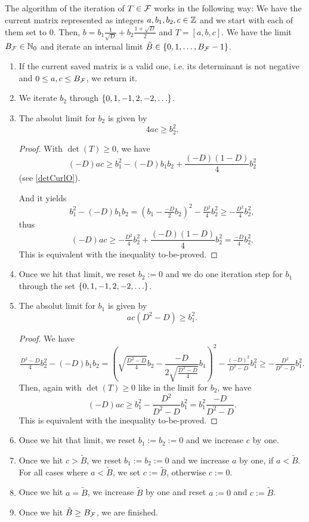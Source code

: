The algorithm of the iteration of $T \in \mathcal{F}$ works in the following way: We have the current matrix represented as integers $a,b_1,b_2,c \in \mathbb{Z}$ and we start with each of them set to $0$. Then, $b = b_1 \frac{1}{\sqrt{D}} + b_2 \frac{1 + \sqrt{D}} {2}$ and $T = [a,b,c]$. We have the limit $B_{\mathcal{F}} \in \mathbb{N}_0$ and iterate an internal limit $\tilde{B} \in \Set{0,1,\dots,B_\F-1}$.
\begin{enumerate}
\item If the current saved matrix is a valid one, i.e. its determinant is not negative and $0 \le a,c \le B_{\mathcal{F}}$, we return it.
\item We iterate $b_2$ through $\Set{0,1,-1,2,-2,\dots}$.
\item
The absolut limit for $b_2$ is given by
\[ 4 a c \ge b_2^2 . \]
\begin{proof}
With $\det(T) \ge 0$, we have
\[ (-D) a c \ge b_1^2 - (-D) b_1 b_2 + \frac{(-D)(1-D)}{4} b_2^2 \]
(see \cref{detCurlO}).

And it yields
\[ b_1^2 - (-D) b_1 b_2 = (b_1 - \tfrac{-D}{2} b_2)^2 - \tfrac{D^2}{4} b_2^2 \ge - \tfrac{D^2}{4} b_2^2 , \]
thus
\[ (-D) a c \ge - \tfrac{D^2}{4} b_2^2 + \frac{(-D)(1-D)}{4} b_2^2 = \tfrac{-D}{4} b_2^2 . \]
This is equivalent with the inequality to-be-proved.
\end{proof}
\item Once we hit that limit, we reset $b_2 := 0$ and we do one iteration step for $b_1$ through the set $\Set{0,1,-1,2,-2,\dots}$.
\item
The absolut limit for $b_1$ is given by
\[ a c (D^2 - D) \ge b_1^2 . \]
\begin{proof}
We have
\[ \tfrac{D^2-D}{4} b_2^2 - (-D) b_1 b_2
= \left( \sqrt{\tfrac{D^2-D}{4}} b_2 - \frac{-D}{2 \sqrt{\tfrac{D^2-D}{4}}} b_1 \right)^2
- \tfrac{(-D)^2}{D^2 - D} b_1^2
\ge - \tfrac{D^2}{D^2 - D} b_1^2 .
\]
Then, again with $\det(T) \ge 0$ like in the limit for $b_2$, we have
\[ (-D) a c \ge b_1^2 - \frac{D^2}{D^2 - D} b_1^2 = b_1^2 \frac{-D}{D^2-D} . \]
This is equivalent with the inequality to-be-proved.
\end{proof}
\item Once we hit that limit, we reset $b_1 := b_2 := 0$ and we increase $c$ by one.
\item Once we hit $c > \tilde{B}$, we reset $b_1 := b_2 := 0$ and we increase $a$ by one, if $a < \tilde{B}$. For all cases where $a < \tilde{B}$, we set $c := \tilde{B}$, otherwise $c := 0$.
\item Once we hit $a = \tilde{B}$, we increase $\tilde{B}$ by one and reset $a := 0$ and $c := \tilde{B}$.
\item Once we hit $\tilde{B} \ge B_{\mathcal{F}}$, we are finished.
\end{enumerate}

